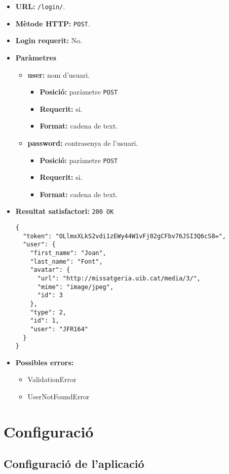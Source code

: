 \begin{itemize}
\item \textbf{\ac{URL}: } \texttt{/login/}.
\item \textbf{Mètode \ac{HTTP}: } \texttt{POST}.
\item \textbf{Login requerit:} No.
\item \textbf{Paràmetres}
	\begin{itemize}
		\item \textbf{user:} nom d'usuari.
			\begin{itemize}
				\item \textbf{Posició:} paràmetre \texttt{POST} 
				\item \textbf{Requerit:} si.
				\item \textbf{Format:} cadena de text.
			\end{itemize}
		\item \textbf{password:} contrasenya de l'usuari.
			\begin{itemize}
				\item \textbf{Posició:} paràmetre \texttt{POST} 
				\item \textbf{Requerit:} si.
				\item \textbf{Format:} cadena de text.
			\end{itemize}
	\end{itemize}
\item \textbf{Resultat satisfactori:} \texttt{200 OK}
	\begin{verbatim}
{
  "token": "OLlmxXLkS2vdi1zEWy44W1vFj02gCFbv76JSI3Q6cS8=",
  "user": {
    "first_name": "Joan",
    "last_name": "Font",
    "avatar": {
      "url": "http://missatgeria.uib.cat/media/3/",
      "mime": "image/jpeg",
      "id": 3
    },
    "type": 2,
    "id": 1,
    "user": "JFR164"
  }
}
	\end{verbatim}
\item \textbf{Possibles errors:}
	\begin{itemize}
		\item ValidationError
		\item UserNotFoundError
	\end{itemize}
\end{itemize}

\section{Configuració}

\subsection{Configuració de l'aplicació}

